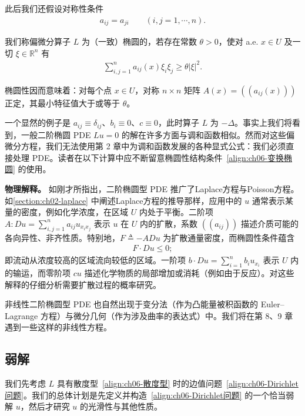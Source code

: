 \documentclass[../../main.tex]{subfiles}
\begin{document}
此后我们还假设对称性条件
\begin{align*}
a_{ij}=a_{ji}\qquad (i,j=1,\cdots,n).
\end{align*}

\begin{definition}\label{definition:ch06-椭圆性}
我们称偏微分算子 $L$ 为（一致）椭圆的，若存在常数 $\theta>0$，使对 a.e. $x\in U$ 及一切 $\xi\in\mathbb{R}^{n}$ 有
\begin{align}
\sum_{i,j=1}^{n}a_{ij}(x)\xi_{i}\xi_{j}\geqslant\theta|\xi|^{2}.
\label{align:ch06-变换椭圆}
\end{align}
\end{definition}

椭圆性因而意味着：对每个点 $x\in U$，对称 $n\times n$ 矩阵 $A(x)=((a_{ij}(x)))$ 正定，其最小特征值大于或等于 $\theta$。

一个显然的例子是 $a_{ij}\equiv\delta_{ij}$、$b_{i}\equiv 0$、$c\equiv 0$，此时算子 $L$ 为 $-\Delta$。事实上我们将看到，一般二阶椭圆 PDE $Lu=0$ 的解在许多方面与调和函数相似。然而对这些偏微分方程，我们无法使用第 2 章中为调和函数发展的各种显式公式：我们必须直接处理 PDE。读者在以下计算中应不断留意椭圆性结构条件~\eqref{align:ch06-变换椭圆} 的使用。

\textbf{物理解释。} 如刚才所指出，二阶椭圆型 PDE 推广了Laplace方程与Poisson方程。如\cref{section:ch02-laplace} 中阐述Laplace方程的推导那样，应用中的 $u$ 通常表示某量的密度，例如化学浓度，在区域 $U$ 内处于平衡。二阶项 $A:Du=\sum_{i,j=1}^{n}a_{ij}u_{x_{i}x_{j}}$ 表示 $u$ 在 $U$ 内的扩散，系数 $((a_{ij}))$ 描述介质可能的各向异性、非齐性质。特别地，$F\triangleq-ADu$ 为扩散通量密度，而椭圆性条件蕴含
\begin{align*}
F\cdot Du\leqslant 0;
\end{align*}
即流动从浓度较高的区域流向较低的区域。一阶项 $b\cdot Du=\sum_{i=1}^{n}b_{i}u_{x_{i}}$ 表示 $U$ 内的输运，而零阶项 $cu$ 描述化学物质的局部增加或消耗（例如由于反应）。对这些解释的仔细分析需要扩散过程的概率研究。

非线性二阶椭圆型 PDE 也自然出现于变分法（作为凸能量被积函数的 Euler--Lagrange 方程）与微分几何（作为涉及曲率的表达式）中。我们将在第 8、9 章遇到一些这样的非线性方程。

\subsection{弱解}\label{subsection:ch06-弱解}

我们先考虑 $L$ 具有散度型~\eqref{align:ch06-散度型} 时的边值问题~\eqref{align:ch06-Dirichlet问题}。我们的总体计划是先定义并构造~\eqref{align:ch06-Dirichlet问题} 的一个恰当弱解 $u$，然后才研究 $u$ 的光滑性与其他性质。
\end{document}
